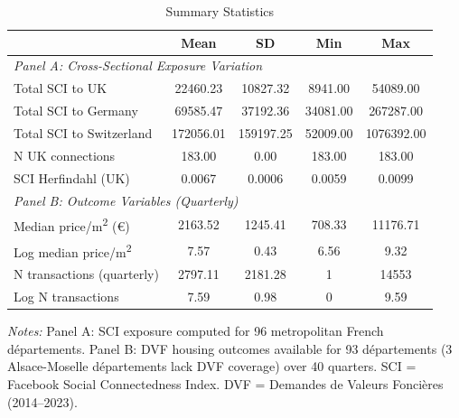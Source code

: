 \begin{table}[htbp]
\centering
\caption{Summary Statistics}
\label{tab:summary}
\begin{tabular}{lcccc}
\toprule
 & Mean & SD & Min & Max \\
\midrule
\multicolumn{5}{l}{\textit{Panel A: Cross-Sectional Exposure Variation}} \\[3pt]
Total SCI to UK & 22460.23 & 10827.32 & 8941.00 & 54089.00 \\
Total SCI to Germany & 69585.47 & 37192.36 & 34081.00 & 267287.00 \\
Total SCI to Switzerland & 172056.01 & 159197.25 & 52009.00 & 1076392.00 \\
N UK connections & 183.00 & 0.00 & 183.00 & 183.00 \\
SCI Herfindahl (UK) & 0.0067 & 0.0006 & 0.0059 & 0.0099 \\
\midrule
\multicolumn{5}{l}{\textit{Panel B: Outcome Variables (Quarterly)}} \\[3pt]
Median price/m\textsuperscript{2} (\euro{}) & 2163.52 & 1245.41 & 708.33 & 11176.71 \\
Log median price/m\textsuperscript{2} & 7.57 & 0.43 & 6.56 & 9.32 \\
N transactions (quarterly) & 2797.11 & 2181.28 & 1 & 14553 \\
Log N transactions & 7.59 & 0.98 & 0 & 9.59 \\
\bottomrule
\end{tabular}
\begin{minipage}{0.9\textwidth}
\footnotesize \textit{Notes:} Panel A: SCI exposure computed for 96 metropolitan French d\'{e}partements. Panel B: DVF housing outcomes available for 93 d\'{e}partements (3 Alsace-Moselle d\'{e}partements lack DVF coverage) over 40 quarters. SCI = Facebook Social Connectedness Index. DVF = Demandes de Valeurs Fonci\`eres (2014--2023).
\end{minipage}
\end{table}
